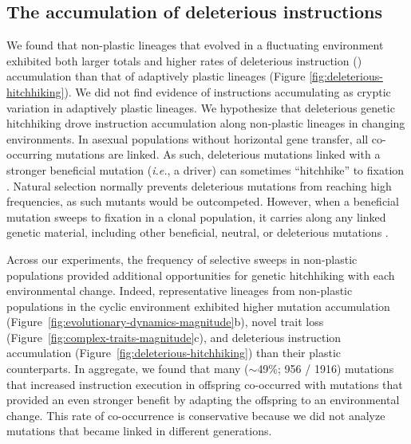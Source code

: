 \subsection{The accumulation of deleterious instructions}

We found that non-plastic lineages that evolved in a fluctuating environment exhibited both larger totals and higher rates of deleterious instruction () accumulation than that of adaptively plastic lineages (Figure \ref{fig:deleterious-hitchhiking}).
We did not find evidence of  instructions accumulating as cryptic variation in adaptively plastic lineages.
We hypothesize that deleterious genetic hitchhiking drove  instruction accumulation along non-plastic lineages in changing environments.
In asexual populations without horizontal gene transfer, all co-occurring mutations are linked.
As such, deleterious mutations linked with a stronger beneficial mutation (\textit{i.e.}, a driver) can sometimes ``hitchhike'' to fixation \citep{smith_hitch-hiking_1974,van_den_bergh_experimental_2018,buskirk_hitchhiking_2017}.
Natural selection normally prevents deleterious mutations from reaching high frequencies, as such mutants would be outcompeted.
However, when a beneficial mutation sweeps to fixation in a clonal population, it carries along any linked genetic material, including other beneficial, neutral, or deleterious mutations  \cite{barton_genetic_2000, smith_hitch-hiking_1974}.

Across our experiments, the frequency of selective sweeps in non-plastic populations provided additional opportunities for genetic hitchhiking with each environmental change. 
Indeed, representative lineages from non-plastic populations in the cyclic environment exhibited higher mutation accumulation (Figure~\ref{fig:evolutionary-dynamics-magnitude}b), novel trait loss (Figure~\ref{fig:complex-traits-magnitude}c), and deleterious instruction accumulation (Figure~\ref{fig:deleterious-hitchhiking}) than their plastic counterparts.
In aggregate, we found that many ($\sim$49\%; 956 / 1916) mutations that increased  instruction execution in offspring co-occurred with mutations that provided an even stronger benefit by adapting the offspring to an environmental change.
This rate of co-occurrence is conservative because we did not analyze mutations that became linked in different generations.

